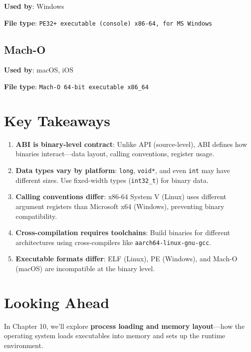 \textbf{Used by}: Windows

\textbf{File type}: \texttt{PE32+ executable (console) x86-64, for MS Windows}

\subsection{Mach-O}

\textbf{Used by}: macOS, iOS

\textbf{File type}: \texttt{Mach-O 64-bit executable x86\_64}

\section{Key Takeaways}

\begin{enumerate}
    \item \textbf{ABI is binary-level contract}: Unlike API (source-level), ABI defines how binaries interact—data layout, calling conventions, register usage.
    \item \textbf{Data types vary by platform}: \texttt{long}, \texttt{void*}, and even \texttt{int} may have different sizes. Use fixed-width types (\texttt{int32\_t}) for binary data.
    \item \textbf{Calling conventions differ}: x86-64 System V (Linux) uses different argument registers than Microsoft x64 (Windows), preventing binary compatibility.
    \item \textbf{Cross-compilation requires toolchains}: Build binaries for different architectures using cross-compilers like \texttt{aarch64-linux-gnu-gcc}.
    \item \textbf{Executable formats differ}: ELF (Linux), PE (Windows), and Mach-O (macOS) are incompatible at the binary level.
\end{enumerate}

\section{Looking Ahead}

In Chapter 10, we'll explore \textbf{process loading and memory layout}—how the operating system loads executables into memory and sets up the runtime environment.
